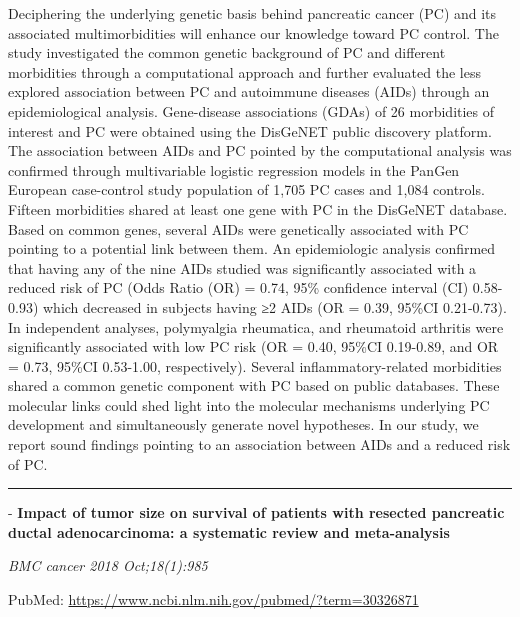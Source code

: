 \documentclass[]{article}
\begin{document}
Deciphering the underlying genetic basis behind pancreatic cancer (PC)
and its associated multimorbidities will enhance our knowledge toward PC
control. The study investigated the common genetic background of PC and
different morbidities through a computational approach and further
evaluated the less explored association between PC and autoimmune
diseases (AIDs) through an epidemiological analysis. Gene-disease
associations (GDAs) of 26 morbidities of interest and PC were obtained
using the DisGeNET public discovery platform. The association between
AIDs and PC pointed by the computational analysis was confirmed through
multivariable logistic regression models in the PanGen European
case-control study population of 1,705 PC cases and 1,084 controls.
Fifteen morbidities shared at least one gene with PC in the DisGeNET
database. Based on common genes, several AIDs were genetically
associated with PC pointing to a potential link between them. An
epidemiologic analysis confirmed that having any of the nine AIDs
studied was significantly associated with a reduced risk of PC (Odds
Ratio (OR) = 0.74, 95\% confidence interval (CI) 0.58-0.93) which
decreased in subjects having ≥2 AIDs (OR = 0.39, 95\%CI 0.21-0.73). In
independent analyses, polymyalgia rheumatica, and rheumatoid arthritis
were significantly associated with low PC risk (OR = 0.40, 95\%CI
0.19-0.89, and OR = 0.73, 95\%CI 0.53-1.00, respectively). Several
inflammatory-related morbidities shared a common genetic component with
PC based on public databases. These molecular links could shed light
into the molecular mechanisms underlying PC development and
simultaneously generate novel hypotheses. In our study, we report sound
findings pointing to an association between AIDs and a reduced risk of
PC.

{}

{}

\begin{center}\rule{0.5\linewidth}{\linethickness}\end{center}

 - \textbf{Impact of tumor size on survival of patients with resected
pancreatic ductal adenocarcinoma: a systematic review and meta-analysis}

\emph{BMC cancer 2018 Oct;18(1):985}

PubMed: \url{https://www.ncbi.nlm.nih.gov/pubmed/?term=30326871}
\end{document}
